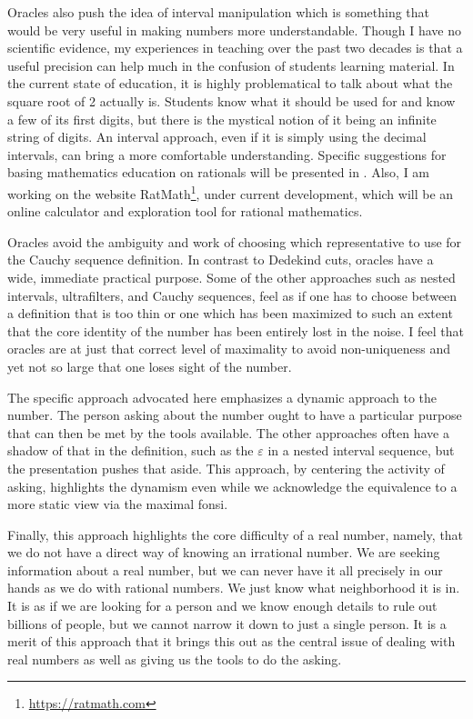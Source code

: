 \documentclass[12pt]{article}
\begin{document}
Oracles also push the idea of interval manipulation which is something that would be very useful in making numbers more understandable. Though I have no scientific evidence, my experiences in teaching over the past two decades is that a useful precision can help much in the confusion of students learning material. In the current state of education, it is highly problematical to talk about what the square root of 2 actually is. Students know what it should be used for and know a few of its first digits, but there is the mystical notion of it being an infinite string of digits. An interval approach, even if it is simply using the decimal intervals, can bring a more comfortable understanding. Specific suggestions for basing mathematics education on rationals will be presented in \cite{taylor23edu}. Also, I am working on the website RatMath\footnote{\url{https://ratmath.com}}, under current development, which will be an online calculator and exploration tool for rational mathematics. 

Oracles avoid the ambiguity and work of choosing which representative to use for the Cauchy sequence definition. In contrast to Dedekind cuts, oracles have a wide, immediate practical purpose. Some of the other approaches such as nested intervals, ultrafilters, and Cauchy sequences, feel as if one has to choose between a definition that is too thin or one which has been maximized to such an extent that the core identity of the number has been entirely lost in the noise. I feel that oracles are at just that correct level of maximality to avoid non-uniqueness and yet not so large that one loses sight of the number. 

The specific approach advocated here emphasizes a dynamic approach to the number. The person asking about the number ought to have a particular purpose that can then be met by the tools available. The other approaches often have a shadow of that in the definition, such as the $\varepsilon$ in a nested interval sequence, but the presentation pushes that aside. This approach, by centering the activity of asking, highlights the dynamism even while we acknowledge the equivalence to a more static view via the maximal fonsi.  

Finally, this approach highlights the core difficulty of a real number, namely, that we do not have a direct way of knowing an irrational number. We are seeking information about a real number, but we can never have it all precisely in our hands as we do with rational numbers. We just know what neighborhood it is in. It is as if we are looking for a person and we know enough details to rule out billions of people, but we cannot narrow it down to just a single person. It is a merit of this approach that it brings this out as the central issue of dealing with real numbers as well as giving us the tools to do the asking. 
\end{document}
